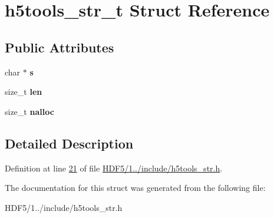 \hypertarget{structh5tools__str__t}{}\section{h5tools\+\_\+str\+\_\+t Struct Reference}
\label{structh5tools__str__t}
\subsection*{Public Attributes}
\begin{DoxyCompactItemize}
\item 
\mbox{\label{structh5tools__str__t_aa4d646e68a02f1a37e7e229d1cac29df}} 
char $\ast$ {\bfseries s}
\item 
\mbox{\label{structh5tools__str__t_a8f72333c4313ef9dd4923987c6799681}} 
size\+\_\+t {\bfseries len}
\item 
\mbox{\label{structh5tools__str__t_aa12c7bb16883bf828f2c919f219c8594}} 
size\+\_\+t {\bfseries nalloc}
\end{DoxyCompactItemize}


\subsection{Detailed Description}


Definition at line \hyperlink{_h_d_f5_21_810_81_2include_2h5tools__str_8h_source_l00021}{21} of file \hyperlink{_h_d_f5_21_810_81_2include_2h5tools__str_8h_source}{H\+D\+F5/1../include/h5tools\+\_\+str.\+h}.



The documentation for this struct was generated from the following file\+:\begin{DoxyCompactItemize}
\item 
H\+D\+F5/1../include/h5tools\+\_\+str.\+h\end{DoxyCompactItemize}
